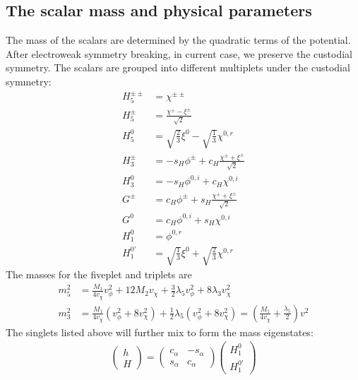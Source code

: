 \documentclass[12pt]{article}
\begin{document}
\subsection{The scalar mass and physical parameters}
The mass of the scalars are determined by the quadratic terms of the potential. After electroweak symmetry breaking, in current case, we preserve the custodial symmetry. The scalars are grouped into different multiplets under the custodial symmetry:
\begin{subequations}
    \begin{align}
        H_5^{\pm\pm} &= \chi^{\pm\pm}\\
        H_5^\pm &= \frac{\chi^\pm-\xi^\pm}{\sqrt{2}}\\
        H_5^0 &= \sqrt{\frac{2}{3}}\xi^0 - \sqrt{\frac{1}{3}}\chi^{0,r}\\
        H_3^\pm &= - s_H \phi^\pm + c_H \frac{\chi^\pm+\xi^\pm}{\sqrt{2}}\\
        H_3^0 &= -s_H \phi^{0,i} + c_H \chi^{0,i}\\
        G^\pm &= c_H\phi^\pm + s_H\frac{\chi^\pm+\xi^\pm}{\sqrt{2}}\\
        G^0 &= c_H \phi^{0,i} + s_H \chi^{0,i}\\
        H_1^0 &= \phi^{0,r} \\
        H_1^{0\prime} &= \sqrt{\frac{1}{3}}\xi^0 + \sqrt{\frac{2}{3}}\chi^{0,r}
    \end{align}
\end{subequations}
The masses for the fiveplet and triplets are
\begin{align}
    m_5^2 &= \frac{M_1}{4v_\chi}v_\phi^2 + 12M_2v_\chi + \frac{3}{2}\lambda_5 v_\phi^2 + 8\lambda_3 v_\chi^2\\
    m_3^2 &= \frac{M_1}{4v_\chi}(v_\phi^2+8v_\chi^2)+\frac{1}{2}\lambda_5 (v_\phi^2 + 8 v_\chi^2) = \left(\frac{M_1}{4v_\chi}+\frac{\lambda_5}{2}\right)v^2
\end{align}
The singlets listed above will further mix to form the mass eigenstates:
\begin{align}
\label{equ:mixing_singlet}
\begin{pmatrix}
    h\\
    H
\end{pmatrix} = \begin{pmatrix}
    c_\alpha & -s_\alpha \\
    s_\alpha & c_\alpha
\end{pmatrix}\begin{pmatrix}
    H_1^0\\
    H_1^{0\prime}
\end{pmatrix}
\end{align}
\end{document}
